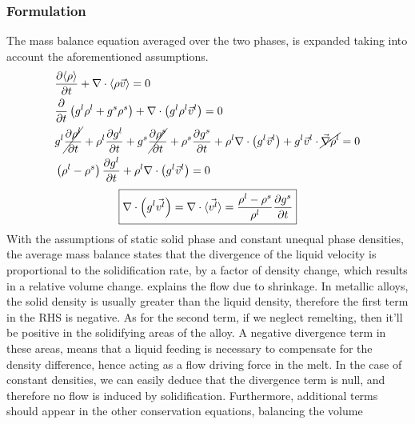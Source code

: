 \subsubsection{Formulation}
The mass balance equation averaged over the two phases, is expanded taking into account the aforementioned assumptions.
%
\begin{subequations}
\label{eq:shrinkage}
\begin{align}
& \frac{\partial \langle \rho \rangle}{\partial t} + \nabla \cdot \langle \rho \vec{v} \rangle  = 0 \\ 
& \frac{\partial }{\partial t} \left(  {g^l} \rho^l + {g^s} \rho^s \right) + \nabla \cdot \left(  {g^l} \rho^l \vec{v}^l \right) = 0 \\ 
& {g^l} \cancel{\frac{\partial \rho^l }{\partial t}} + \rho^l \frac{\partial  {g^l} }{\partial t} 
	+ {g^s} \cancel{\frac{\partial \rho^s }{\partial t}} + \rho^s \frac{\partial  {g^s} }{\partial t} 
	+ \rho^l \nabla \cdot \left(  {g^l} \vec{v}^l \right) 
	+ {g^l} \vec{v}^l \cdot  \cancel{ \vec{\nabla} \rho^l }	 = 0 \\
& \left(  \rho^l - \rho^s  \right) \frac{\partial  {g^l} }{\partial t} + \rho^l \nabla \cdot \left(  {g^l} \vec{v}^l \right)  = 0
\end{align}
\end{subequations}
\begin{align}
\label{eq:mass_balance_metal}
 \boxed{\nabla \cdot \left(  {g^l} \vec{v^l} \right) 
 	= \nabla \cdot \langle \vec{v^l} \rangle
 	= \frac{\rho^l-\rho^s}{\rho^l} \frac{\partial  {g^s} }{\partial t}}
\end{align}
%
With the assumptions of static solid phase and constant unequal phase densities, the average mass balance states that 
the divergence of the liquid velocity is proportional to the solidification rate, by a factor of density change, 
which results in a relative volume change.  explains the flow due to shrinkage. In metallic alloys, the solid density is
usually greater than the liquid density, therefore the first term in the RHS is negative. As for the second term, if we
neglect remelting, then it'll be positive in the solidifying areas of the alloy. A negative divergence term in these areas, 
means that a liquid feeding is necessary to compensate for the density difference, hence acting as a flow driving force in the melt.
In the case of constant densities, we can easily deduce that the divergence term is null, and therefore no flow is induced
by solidification. Furthermore, additional terms should appear in the other conservation equations, balancing the volume 
